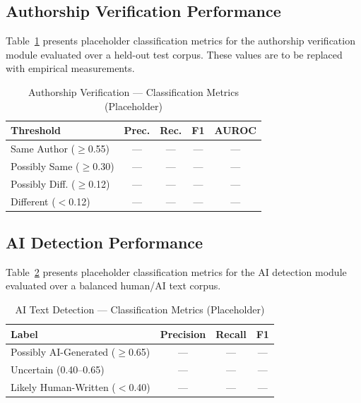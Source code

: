 \documentclass[conference]{IEEEtran}
\begin{document}
\subsection{Authorship Verification Performance}

Table~\ref{tab:auth_results} presents placeholder classification metrics for
the authorship verification module evaluated over a held-out test corpus.
These values are to be replaced with empirical measurements.

\begin{table}[htbp]
\caption{Authorship Verification --- Classification Metrics (Placeholder)}
\begin{center}
\begin{tabular}{lcccc}
\toprule
\textbf{Threshold} & \textbf{Prec.} & \textbf{Rec.} & \textbf{F1} & \textbf{AUROC} \\
\midrule
Same Author ($\geq$0.55)       & --- & --- & --- & --- \\
Possibly Same ($\geq$0.30)     & --- & --- & --- & --- \\
Possibly Diff. ($\geq$0.12)    & --- & --- & --- & --- \\
Different ($<$0.12)            & --- & --- & --- & --- \\
\bottomrule
\end{tabular}
\end{center}
\label{tab:auth_results}
\end{table}

\subsection{AI Detection Performance}

Table~\ref{tab:ai_results} presents placeholder classification metrics for the
AI detection module evaluated over a balanced human/AI text corpus.

\begin{table}[htbp]
\caption{AI Text Detection --- Classification Metrics (Placeholder)}
\begin{center}
\begin{tabular}{lccc}
\toprule
\textbf{Label} & \textbf{Precision} & \textbf{Recall} & \textbf{F1} \\
\midrule
Possibly AI-Generated ($\geq$0.65) & --- & --- & --- \\
Uncertain (0.40--0.65)             & --- & --- & --- \\
Likely Human-Written ($<$0.40)     & --- & --- & --- \\
\bottomrule
\end{tabular}
\end{center}
\label{tab:ai_results}
\end{table}
\end{document}
